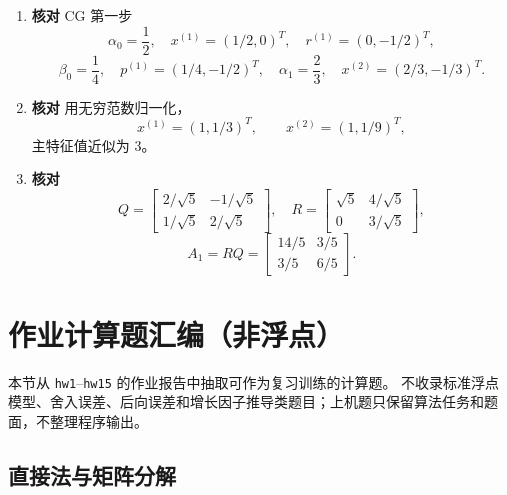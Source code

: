 \documentclass{article}
\newcommand{\answertag}{\textcolor{green!45!black}{\textbf{核对}}}
\begin{document}
\begin{enumerate}
  \item \answertag{} CG 第一步
  \[
    \alpha_0=\frac12,\quad x^{(1)}=(1/2,0)^T,\quad r^{(1)}=(0,-1/2)^T,
  \]
  \[
    \beta_0=\frac14,\quad p^{(1)}=(1/4,-1/2)^T,\quad
    \alpha_1=\frac23,\quad x^{(2)}=(2/3,-1/3)^T.
  \]

  \item \answertag{} 用无穷范数归一化，
  \[
    x^{(1)}=(1,1/3)^T,\qquad x^{(2)}=(1,1/9)^T,
  \]
  主特征值近似为 $3$。

  \item \answertag{}
  \[
    Q=\begin{bmatrix}2/\sqrt5&-1/\sqrt5\\1/\sqrt5&2/\sqrt5\end{bmatrix},\quad
    R=\begin{bmatrix}\sqrt5&4/\sqrt5\\0&3/\sqrt5\end{bmatrix},
  \]
  \[
    A_1=RQ=\begin{bmatrix}14/5&3/5\\3/5&6/5\end{bmatrix}.
  \]
\end{enumerate}

\section{作业计算题汇编（非浮点）}

\noindent 本节从 \texttt{hw1}--\texttt{hw15} 的作业报告中抽取可作为复习训练的计算题。
不收录标准浮点模型、舍入误差、后向误差和增长因子推导类题目；上机题只保留算法任务和题面，不整理程序输出。

\subsection{直接法与矩阵分解}
\end{document}
